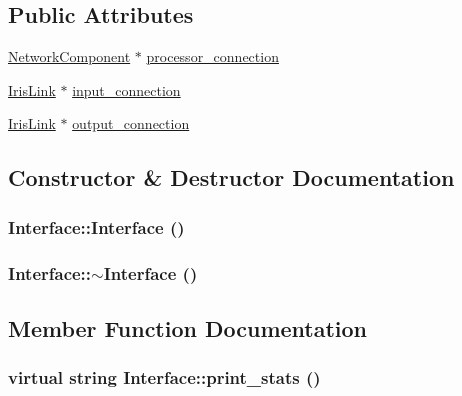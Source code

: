 \subsection*{Public Attributes}
\begin{CompactItemize}
\item 
\hyperlink{classNetworkComponent}{NetworkComponent} $\ast$ \hyperlink{classInterface_5008ad5bfdf390821d9b6de2272fbe6d}{processor\_\-connection}
\item 
\hyperlink{classIrisLink}{IrisLink} $\ast$ \hyperlink{classInterface_c14fb826229e323ebef2813f887ac37f}{input\_\-connection}
\item 
\hyperlink{classIrisLink}{IrisLink} $\ast$ \hyperlink{classInterface_2fee13a07ffc4a43dd50892b22feca92}{output\_\-connection}
\end{CompactItemize}


\subsection{Constructor \& Destructor Documentation}
\hypertarget{classInterface_4406d74c75bdfe150bf72be1f1cda8b1}{
\subsubsection[{Interface}]{\setlength{\rightskip}{0pt plus 5cm}Interface::Interface ()}}
\label{classInterface_4406d74c75bdfe150bf72be1f1cda8b1}


\hypertarget{classInterface_19179888f29f18f1be54a3dfe98f68c0}{
\subsubsection[{$\sim$Interface}]{\setlength{\rightskip}{0pt plus 5cm}Interface::$\sim$Interface ()}}
\label{classInterface_19179888f29f18f1be54a3dfe98f68c0}




\subsection{Member Function Documentation}
\hypertarget{classInterface_abfe4b675df488fd5a88d2876cff0ebe}{
\subsubsection[{print\_\-stats}]{\setlength{\rightskip}{0pt plus 5cm}virtual string Interface::print\_\-stats ()}}
\label{classInterface_abfe4b675df488fd5a88d2876cff0ebe}




